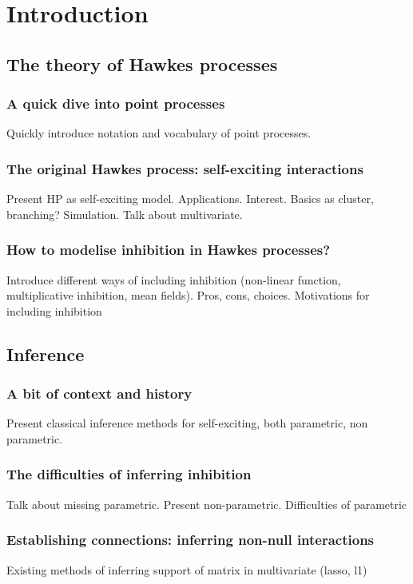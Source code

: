 \chapter*{Introduction}


\section{The theory of Hawkes processes}
    \subsection{A quick dive into point processes}
        Quickly introduce notation and vocabulary of point processes.
    \subsection{The original Hawkes process: self-exciting interactions}
        Present HP as self-exciting model. Applications. Interest.
        Basics as cluster, branching? 
        Simulation.
        Talk about multivariate.
    \subsection{How to modelise inhibition in Hawkes processes?}
        Introduce different ways of including inhibition (non-linear function, multiplicative inhibition, mean fields).
            Pros, cons, choices.
        Motivations for including inhibition

\section{Inference}
    \subsection{A bit of context and history}
        Present classical inference methods for self-exciting, both parametric, non parametric.
    \subsection{The difficulties of inferring inhibition}
        Talk about missing parametric. Present non-parametric.
        Difficulties of parametric
    \subsection{Establishing connections: inferring non-null interactions}
        Existing methods of inferring support of matrix in multivariate (lasso, l1) %
